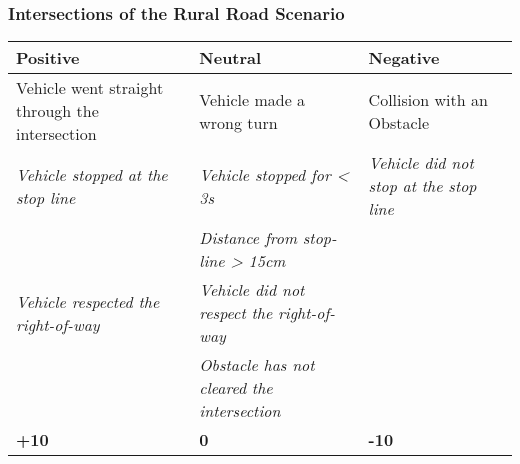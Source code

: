 {	\subsubsection*{Intersections of the Rural Road Scenario}
	\begin{table}[H]
		\begin{tabularx}{\textwidth}{XXX}
			\toprule
			\textbf{Positive}                                           & \textbf{Neutral}                                                   & \textbf{Negative}                                              \\
			\midrule
			Vehicle went straight through the intersection              & Vehicle made a wrong turn                                          & Collision with an Obstacle                                     \\
			\textit{Vehicle stopped at the stop line}\footnotemark[1]   & \textit{Vehicle stopped for < 3s}\footnotemark[1]                  & \textit{Vehicle did not stop at the stop line}\footnotemark[1] \\
			                                                            & \textit{Distance from stop-line > 15cm}\footnotemark[1]            &                                                                \\
			\textit{Vehicle respected the right-of-way}\footnotemark[2] & \textit{Vehicle did not respect the right-of-way}\footnotemark[2]  &                                                                \\
			                                                            & \textit{Obstacle has not cleared the intersection}\footnotemark[2] &                                                                \\
			\topstrut
			\textbf{+10}                                                & \textbf{0}                                                         & \textbf{-10}                                                   \\
			\bottomrule
		\end{tabularx}
	\end{table}


}
